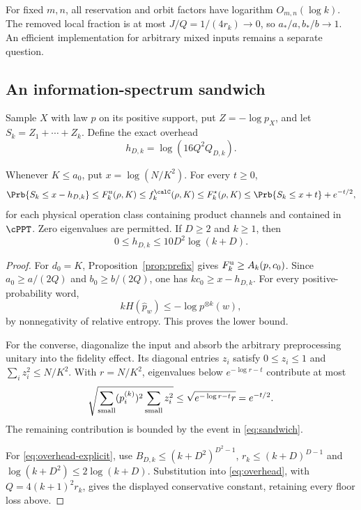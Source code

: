For fixed $m,n$, all reservation and orbit factors have logarithm $O_{m,n}(\log k)$. The removed local fraction is at most $J/Q=1/(4r_k)\to0$, so $a_*/a,b_*/b\to1$. An efficient implementation for arbitrary mixed inputs remains a separate question.

\subsection{An information-spectrum sandwich}
Sample $X$ with law $p$ on its positive support, put $Z=-\log p_X$, and let $S_k=Z_1+\cdots+Z_k$. Define the exact overhead
\begin{equation}\label{eq:overhead}
 h_{D,k}=\log(16Q^2Q_{D,k}).
\end{equation}

\begin{theorem}\label{thm:sandwich}
Whenever $K\le a_0$, put $x=\log(N/K^2)$. For every $t\ge0$,
\begin{equation}\label{eq:sandwich}
 \Prb\{S_k\le x-h_{D,k}\}\le F_k^{\rm u}(\rho,K)
 \le f_k^{\calC}(\rho,K)\le F_k^\star(\rho,K)
 \le\Prb\{S_k\le x+t\}+e^{-t/2},
\end{equation}
for each physical operation class containing product channels and contained in $\cPPT$. Zero eigenvalues are permitted. If $D\ge2$ and $k\ge1$, then
\begin{equation}\label{eq:overhead-explicit}
 0\le h_{D,k}\le10D^2\log(k+D).
\end{equation}
\end{theorem}
\begin{proof}
For $d_0=K$, Proposition~\ref{prop:prefix} gives $F_k^{\rm u}\ge A_k(p,c_0)$. Since $a_0\ge a/(2Q)$ and $b_0\ge b/(2Q)$, one has $kc_0\ge x-h_{D,k}$. For every positive-probability word,
\[
 kH(\widehat p_w)\le-\log p^{\otimes k}(w),
\]
by nonnegativity of relative entropy. This proves the lower bound.

For the converse, diagonalize the input and absorb the arbitrary preprocessing unitary into the fidelity effect. Its diagonal entries $z_i$ satisfy $0\le z_i\le1$ and $\sum_i z_i^2\le N/K^2$. With $r=N/K^2$, eigenvalues below $e^{-\log r-t}$ contribute at most
\[
 \sqrt{\sum_{\rm small}(p_i^{(k)})^2\sum_{\rm small}z_i^2}
 \le\sqrt{e^{-\log r-t}r}=e^{-t/2}.
\]
The remaining contribution is bounded by the event in \eqref{eq:sandwich}.

For \eqref{eq:overhead-explicit}, use $B_{D,k}\le(k+D^2)^{D^2-1}$, $r_k\le(k+D)^{D-1}$ and $\log(k+D^2)\le2\log(k+D)$. Substitution into \eqref{eq:overhead}, with $Q=4(k+1)^2r_k$, gives the displayed conservative constant, retaining every floor loss above.
\end{proof}

